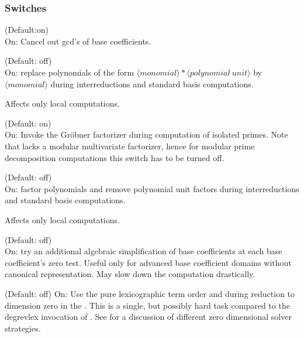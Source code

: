 \subsubsection*{Switches}

\begin{description}
\item{}
  \hypertarget{switch:BCSIMP}{}
  (Default:on) \\
  On: Cancel out gcd's of base coefficients.

\item[\sw{detectunits}]
  \hypertarget{switch:DETECTUNITS}{}
  (Default: off)\\
On: replace polynomials of the form
$\langle monomial\rangle *
\langle polynomial\ unit\rangle $ by $\langle monomial\rangle$
during interreductions and standard basis computations.

Affects only local computations.

\item[\sw{factorprimes}]
  \hypertarget{switch:FACTORPRIMES}{}
  (Default: on)\\
On: Invoke the Gr\"obner factorizer during computation of isolated
primes.  Note that \REDUCE lacks a modular multivariate
factorizer, hence for modular prime decomposition computations this
switch has to be turned off.

\item[\sw{factorunits}]
  \hypertarget{switch:FACTORUNITS}{}
  (Default: off) \\
On: factor polynomials and remove polynomial unit factors
during interreductions and standard basis computations.

Affects only local computations.

\item[\sw{hardzerotest}]
  \hypertarget{switch:HARDZEROTEST}{}
  (Default: off) \\
  On: try an additional algebraic simplification of base
coefficients at each base coefficient's zero test. Useful only for
advanced base coefficient domains without canonical \REDUCE
representation. May slow down the computation drastically.

\item[\sw{lexefgb}]
  \hypertarget{switch:LEXEFGB}{}
  (Default: off)
On: Use the pure lexicographic term order and 
during reduction to dimension zero in the . This is a single, but possibly hard task compared to the
degrevlex invocation of . See \cite{Graebe:95b} for a
discussion of different zero dimensional solver strategies.


\end{description}

